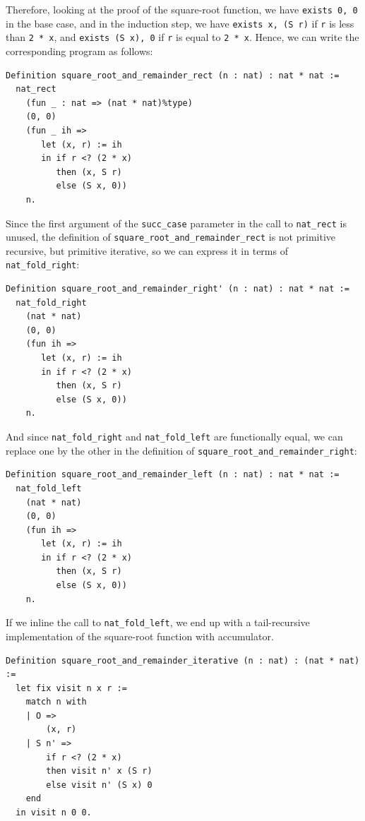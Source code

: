 \documentclass{article}
\begin{document}
Therefore, looking at the proof of the square-root function, we have \texttt{exists 0, 0} in the base case, and in the induction step, we have \texttt{exists x, (S r)} if \texttt{r} is less than \texttt{2 * x}, and \texttt{exists (S x), 0} if \texttt{r} is equal to \texttt{2 * x}. Hence, we can write the corresponding program as follows:

\begin{lstlisting}
Definition square_root_and_remainder_rect (n : nat) : nat * nat :=
  nat_rect
    (fun _ : nat => (nat * nat)%type)
    (0, 0)
    (fun _ ih =>
       let (x, r) := ih
       in if r <? (2 * x)
          then (x, S r)
          else (S x, 0))
    n.
\end{lstlisting}

Since the first argument of the \texttt{succ\_case} parameter in the call to \texttt{nat\_rect} is unused, the definition of \texttt{square\_root\_and\_remainder\_rect} is not primitive recursive, but primitive iterative, so we can express it in terms of \texttt{nat\_fold\_right}:

\begin{lstlisting}
Definition square_root_and_remainder_right' (n : nat) : nat * nat :=
  nat_fold_right
    (nat * nat)
    (0, 0)
    (fun ih =>
       let (x, r) := ih
       in if r <? (2 * x)
          then (x, S r)
          else (S x, 0))
    n.
\end{lstlisting}

And since \texttt{nat\_fold\_right} and \texttt{nat\_fold\_left} are functionally equal, we can replace one by the other in the definition of \texttt{square\_root\_and\_remainder\_right}:

\begin{lstlisting}
Definition square_root_and_remainder_left (n : nat) : nat * nat :=
  nat_fold_left
    (nat * nat)
    (0, 0)
    (fun ih =>
       let (x, r) := ih
       in if r <? (2 * x)
          then (x, S r)
          else (S x, 0))
    n.
\end{lstlisting}

If we inline the call to \texttt{nat\_fold\_left}, we end up with a tail-recursive implementation of the square-root function with accumulator.

\begin{lstlisting}
Definition square_root_and_remainder_iterative (n : nat) : (nat * nat) :=
  let fix visit n x r :=
    match n with
    | O =>
        (x, r)
    | S n' =>
        if r <? (2 * x)
        then visit n' x (S r)
        else visit n' (S x) 0
    end
  in visit n 0 0.
\end{lstlisting}
\end{document}
